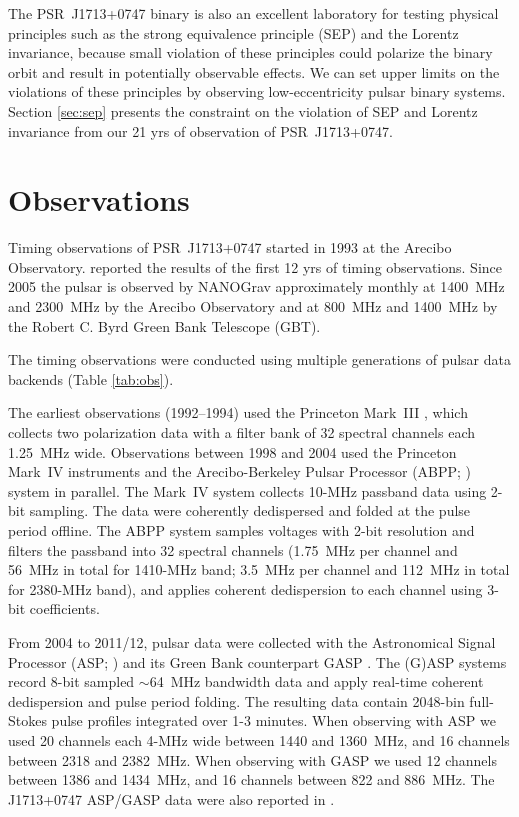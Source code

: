 The PSR~J1713+0747 binary is also an excellent laboratory for testing physical 
principles such as the strong equivalence principle (SEP) and the Lorentz invariance, because small violation of these principles could polarize the
binary orbit and result in potentially observable effects. We can set
upper limits on the violations of these principles by observing
low-eccentricity pulsar binary systems. Section \ref{sec:sep} presents the
constraint on the violation of SEP and Lorentz invariance from our 21 yrs of observation of PSR~J1713+0747.

\section{Observations}
Timing observations of PSR~J1713+0747 started in 1993 at the Arecibo
Observatory. \citet{sns+05} reported the results of the first 12 yrs
of timing observations. Since 2005 the pulsar is observed by NANOGrav approximately monthly
at 1400~MHz and 2300~MHz by the Arecibo
Observatory and at 800~MHz and 1400~MHz by the Robert C. Byrd Green Bank
Telescope (GBT).

The timing observations were conducted using multiple generations of pulsar
data backends (Table \ref{tab:obs}).

The earliest observations (1992--1994) used the Princeton Mark~III
\citep{skn+92}, which collects two polarization data with a filter bank of 32
spectral channels each 1.25~MHz wide. 
Observations between 1998 and 2004 used the Princeton Mark~IV
\citep{sst+00} instruments and the Arecibo-Berkeley Pulsar Processor
(ABPP; \citealt{bdz+97}) system  in parallel. 
The Mark~IV system collects 10-MHz passband data using 2-bit sampling. The
data were coherently dedispersed and folded at the pulse period offline.
The ABPP system samples voltages with 2-bit resolution and filters the passband 
into 32 spectral channels (1.75~MHz
per channel and 56~MHz in total for 1410-MHz band; 3.5~MHz per channel and 
112~MHz in total for 2380-MHz band), and applies coherent dedispersion to each
channel using 3-bit coefficients. 

From 2004 to 2011/12, pulsar data were collected with the Astronomical Signal
Processor (ASP; \citealt{dem07}) and its Green Bank counterpart GASP \citep{dem07}.
The (G)ASP systems record 8-bit sampled $\sim$64~MHz bandwidth data and apply real-time
coherent dedispersion and pulse period folding. The resulting data contain
2048-bin full-Stokes pulse profiles integrated over 1-3 minutes. 
When observing with ASP we used 20 channels each 4-MHz wide between 1440 and
1360~MHz, and 16 channels between 2318 and 2382~MHz. 
When observing with GASP we used 12 channels between 1386 and 1434~MHz, and 16
channels between 822 and 886~MHz.
The J1713+0747 ASP/GASP data were also reported in \citet{dfg+13}.

